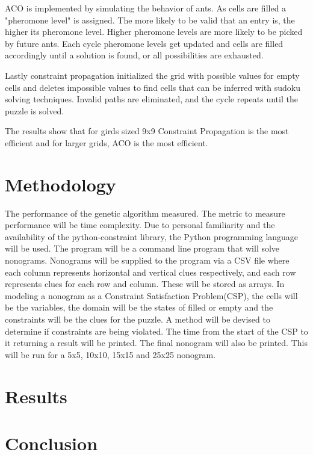 \documentclass[12pt, letterpaper]{article}
\begin{document}
    ACO is implemented by simulating the behavior of ants. As cells are filled a "pheromone level" is assigned. The more likely to be valid that an entry is, the higher its pheromone level. Higher pheromone levels are more likely to be picked by future ants. Each cycle pheromone levels get updated and cells are filled accordingly until a solution is found, or all possibilities are exhausted.

    Lastly constraint propagation initialized the grid with possible values for empty cells and deletes impossible values to find cells that can be inferred with sudoku solving techniques. Invalid paths are eliminated, and the cycle repeats until the puzzle is solved.

    The results show that for girds sized 9x9 Constraint Propagation is the most efficient and for larger grids, ACO is the most efficient.

\section{Methodology}
The performance of the genetic algorithm measured. The metric to measure performance will be time complexity. Due to personal familiarity and the availability of the python-constraint \cite{pycon} library, the Python programming language will be used. The program will be a command line program that will solve nonograms. Nonograms will be supplied to the program via a CSV file where each column represents horizontal and vertical clues respectively, and each row represents clues for each row and column. These will be stored as arrays.
In modeling a nonogram as a Constraint Satisfaction Problem(CSP), the cells will be the variables, the domain will be the states of filled or empty and the constraints will be the clues for the puzzle. A method will be devised to determine if constraints are being violated. The time from the start of the CSP to it returning a result will be printed. The final nonogram will also be printed. This will be run for a 5x5, 10x10, 15x15 and 25x25 nonogram.

\section{Results}

\section{Conclusion}


% 

% 




\end{document}

